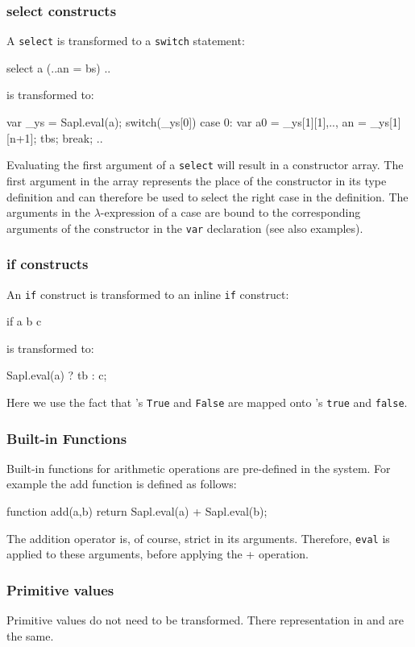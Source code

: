 \subsubsection{\textsf{select} constructs} 
A \texttt{select} is transformed to a \texttt{switch} statement:
\begin{CleanCode}
select a (..an = bs) ..
\end{CleanCode}
is transformed to:
\begin{CleanCode}
var _ys = Sapl.eval(a);
switch(_ys[0]) {
	case 0: var a0 = _ys[1][1],..,  an = _ys[1][n+1];
		tbs;
		break;
	..
}
\end{CleanCode}
Evaluating the first argument of a \texttt{select} will result in a constructor array. 
The first argument in the array represents the place of the constructor in its type definition
and can therefore be used to select the right case in the definition.
The arguments in the $\lambda$-expression of a case are bound to the corresponding
arguments of the constructor in the \texttt{var} declaration (see also examples).

\subsubsection{\textsf{if} constructs} 
An \texttt{if} construct is transformed to an inline \JS \texttt{if} construct:
\begin{CleanCode}
if a b c
\end{CleanCode}
is transformed to:
\begin{CleanCode}
Sapl.eval(a) ? tb : c;
\end{CleanCode}
Here we use the fact that \Sapl's \texttt{True} and \texttt{False} are mapped onto \JS's \texttt{true} and \texttt{false}.

\subsubsection{Built-in Functions}
Built-in functions for arithmetic operations are pre-defined in the system.
For example the \textsf{add} function  is defined as follows:
\begin{CleanCode}
function add(a,b) {return Sapl.eval(a) + Sapl.eval(b);}
\end{CleanCode}
The addition operator is, of course, strict in its arguments. 
Therefore, \texttt{eval} is applied to these arguments, before applying the + operation.

\subsubsection{Primitive values}
Primitive values do not need to be transformed. There representation in \Sapl and \JS are the same.

